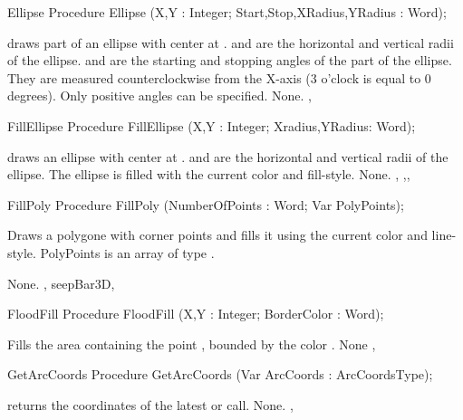 \begin{procedure}{Ellipse}
\Declaration
Procedure Ellipse (X,Y : Integer; Start,Stop,XRadius,YRadius : Word);

\Description
  draws part of an ellipse with center at .
 and  are the horizontal and vertical radii of the
ellipse.  and  are the starting and stopping angles of
the part of the ellipse. They are measured counterclockwise from the X-axis 
(3 o'clock is equal to 0 degrees). Only positive angles can be specified.
\Errors
None.
\SeeAlso
{} , 
\end{procedure}

\begin{procedure}{FillEllipse}
\Declaration
Procedure FillEllipse (X,Y : Integer; Xradius,YRadius: Word);

\Description
  draws an ellipse with center at .
 and  are the horizontal and vertical radii of the
ellipse. The ellipse is filled with the current color and fill-style.
\Errors
None.
\SeeAlso
{} ,
,, 
\end{procedure}

\begin{procedure}{FillPoly}
\Declaration
Procedure FillPoly (NumberOfPoints : Word; Var PolyPoints);

\Description

Draws a polygone with  corner points and fills it
using the current color and line-style. 
PolyPoints is an array of type .

\Errors
None.
\SeeAlso
{}, seep{Bar3D}, 
\end{procedure}

\begin{procedure}{FloodFill}
\Declaration
Procedure FloodFill (X,Y : Integer; BorderColor : Word);

\Description

Fills the area containing the point , bounded by the color
.
\Errors
None
\SeeAlso
{}, 
\end{procedure}

\begin{procedure}{GetArcCoords}
\Declaration
Procedure GetArcCoords (Var ArcCoords : ArcCoordsType);

\Description
{} returns the coordinates of the latest  or
 call.
\Errors
None.
\SeeAlso
{}, 
\end{procedure}

